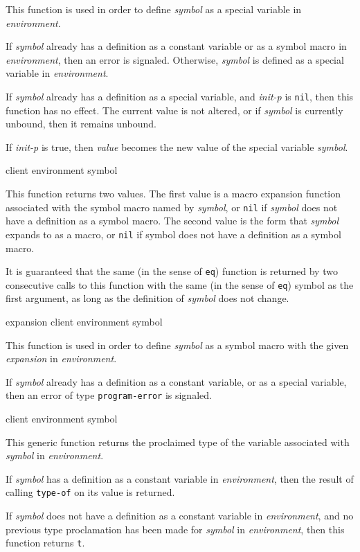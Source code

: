 This function is used in order to define \textit{symbol} as a special
variable in \textit{environment}.

If \textit{symbol} already has a definition as a constant variable or
as a symbol macro in \textit{environment}, then an error is signaled.
Otherwise, \textit{symbol} is defined as a special variable in
\textit{environment}.

If \textit{symbol} already has a definition as a special variable, and
\textit{init-p} is \texttt{nil}, then this function has no effect.
The current value is not altered, or if \textit{symbol} is currently
unbound, then it remains unbound.

If \textit{init-p} is true, then \textit{value} becomes the new value
of the special variable \textit{symbol}.

 {client environment symbol}

This function returns two values.  The first value is a macro
expansion function associated with the symbol macro named by
\textit{symbol}, or \texttt{nil} if \textit{symbol} does not have a
definition as a symbol macro.  The second value is the form that
\textit{symbol} expands to as a macro, or \texttt{nil} if symbol does
not have a definition as a symbol macro.

It is guaranteed that the same (in the sense of \texttt{eq}) function
is returned by two consecutive calls to this function with the same
(in the sense of \texttt{eq})
symbol as the first argument, as long as the definition of
\textit{symbol} does not change.

 {expansion client environment symbol}

This function is used in order to define \textit{symbol} as a symbol
macro with the given \textit{expansion} in \textit{environment}.

If \textit{symbol} already has a definition as a constant variable, or
as a special variable, then an error of type \texttt{program-error} is
signaled.

 {client environment symbol}

This generic function returns the proclaimed type of the variable
associated with \textit{symbol} in \textit{environment}.

If \textit{symbol} has a definition as a constant variable in
\textit{environment}, then the result of calling \texttt{type-of} on
its value is returned.

If \textit{symbol} does not have a definition as a constant variable
in \textit{environment}, and no previous type proclamation has been
made for \textit{symbol} in \textit{environment}, then this function
returns \texttt{t}.

